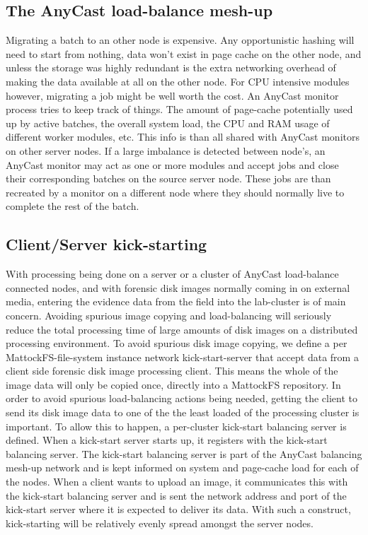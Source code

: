 \subsection{The AnyCast load-balance mesh-up}
Migrating a batch to an other node is expensive. Any opportunistic hashing will need to start from nothing, data won't exist in page cache on the other node, and unless the storage was highly redundant is the extra networking overhead of making the data available at all on the other node. For CPU intensive modules however, migrating a job might be well worth the cost. An AnyCast monitor process tries to keep track of things. The amount of page-cache potentially used up by active batches, the overall system load, the CPU and RAM usage of different worker modules, etc. This info is than all shared with AnyCast monitors on other server nodes. If a large imbalance is detected between node's, an AnyCast monitor may act as one or more modules and accept jobs and close their corresponding batches on the source server node. These jobs are than recreated by a monitor on a different node where they should normally live to complete the rest of the batch.
\subsection{Client/Server kick-starting}
With processing being done on a server or a cluster of AnyCast load-balance connected nodes, and with forensic disk images normally coming in on external media, entering the evidence data from the field into the lab-cluster is of main concern. Avoiding spurious image copying and load-balancing will seriously reduce the total processing time of large amounts of disk images on a distributed processing environment. To avoid spurious disk image copying, we define a per MattockFS-file-system instance network kick-start-server that accept data from a client side forensic disk image processing client. This means the whole of the image data will only be copied once, directly into a MattockFS repository. In order to avoid spurious load-balancing actions being needed, getting the client to send its disk image data to one of the the least loaded of the processing cluster is important. To allow this to happen, a per-cluster kick-start balancing server is defined. When a kick-start server starts up, it registers with the kick-start balancing server. The kick-start balancing server is part of the AnyCast balancing mesh-up network and is kept informed on system and page-cache load for each of the nodes. When a client wants to upload an image, it communicates this with the kick-start balancing server and is sent the network address and port of the kick-start server where it is expected to deliver its data. With such a construct, kick-starting will be relatively evenly spread amongst the server nodes.
